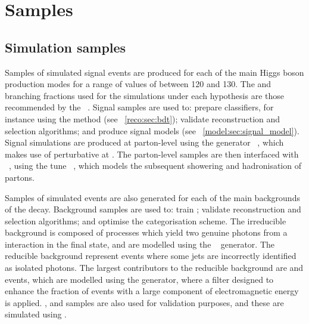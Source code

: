 






\section{Samples}
\label{reco:sec:samples}
\subsection{Simulation samples}

Samples of simulated signal events are produced for each of the main Higgs boson production modes for a range of values of \mH between 120 and 130\GeV. The \crosssection and branching fractions used for the simulations under each \mH hypothesis are those recommended by the \LHCHXSWG~\cite{LHCHXSWGYR4}. Signal samples are used to: prepare classifiers, for instance using the \BDT method (see \Sec~\ref{reco:sec:bdt}); validate reconstruction and selection algorithms; and produce signal models (see \Sec~\ref{model:sec:signal_model}). Signal simulations are produced at parton-level using the generator \Madgraph~\cite{Madgraph}, which makes use of perturbative \QCD at \NLO. The parton-level samples are then interfaced with \Pythia~\cite{Pythia8}, using the tune \PythiaTune~\cite{PythiaTune}, which models the subsequent showering and hadronisation of partons. 

Samples of simulated events are also generated for each of the main backgrounds of the \Hgg decay. Background samples are used to: train \BDT\s; validate reconstruction and selection algorithms; and optimise the categorisation scheme. The irreducible background is composed of \SM processes which yield two genuine photons from a \pp interaction in the final state, and are modelled using the \Sherpa~\cite{Sherpa} generator. The reducible background represent events where some jets are incorrectly identified as isolated photons. The largest contributors to the reducible background are \gammaJet and \QCDmultijet events, which are modelled using the \Pythia generator, where a filter designed to enhance the fraction of events with a large component of electromagnetic energy is applied. %
\DY, \Wg and \Zg samples are also used for validation purposes, and these are simulated using \Madgraph. 

